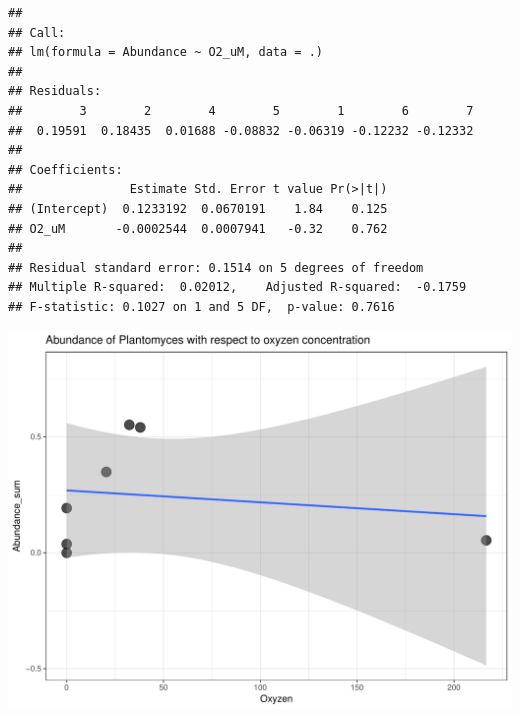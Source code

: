 \documentclass[11 pt,]{article}
\newenvironment{Shaded}{\begin{snugshade}}{\end{snugshade}}
\newcommand{\KeywordTok}[1]{\textcolor[rgb]{0.13,0.29,0.53}{\textbf{#1}}}
\newcommand{\DataTypeTok}[1]{\textcolor[rgb]{0.13,0.29,0.53}{#1}}
\newcommand{\DecValTok}[1]{\textcolor[rgb]{0.00,0.00,0.81}{#1}}
\newcommand{\FloatTok}[1]{\textcolor[rgb]{0.00,0.00,0.81}{#1}}
\newcommand{\StringTok}[1]{\textcolor[rgb]{0.31,0.60,0.02}{#1}}
\newcommand{\OperatorTok}[1]{\textcolor[rgb]{0.81,0.36,0.00}{\textbf{#1}}}
\newcommand{\NormalTok}[1]{#1}
\begin{document}
\begin{verbatim}
## 
## Call:
## lm(formula = Abundance ~ O2_uM, data = .)
## 
## Residuals:
##        3        2        4        5        1        6        7 
##  0.19591  0.18435  0.01688 -0.08832 -0.06319 -0.12232 -0.12332 
## 
## Coefficients:
##               Estimate Std. Error t value Pr(>|t|)
## (Intercept)  0.1233192  0.0670191    1.84    0.125
## O2_uM       -0.0002544  0.0007941   -0.32    0.762
## 
## Residual standard error: 0.1514 on 5 degrees of freedom
## Multiple R-squared:  0.02012,    Adjusted R-squared:  -0.1759 
## F-statistic: 0.1027 on 1 and 5 DF,  p-value: 0.7616
\end{verbatim}

\begin{Shaded}
\end{Shaded}

\includegraphics{Figs/unnamed-chunk-13-1.pdf}
\end{document}
